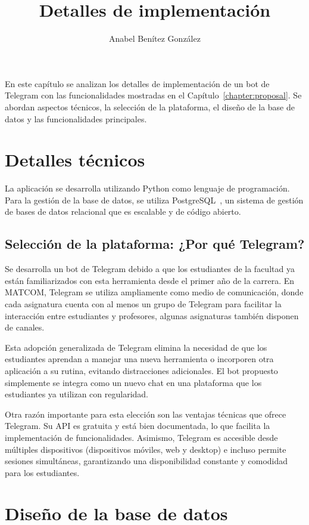 \documentclass{article}
\title{Detalles de implementación}
\author{Anabel Benítez González}
\date{}
\begin{document}
\maketitle

En este capítulo se analizan los detalles de implementación de un bot de Telegram con las funcionalidades mostradas en el Capítulo~\ref{chapter:proposal}. Se abordan aspectos técnicos, la selección de la plataforma, el diseño de la base de datos y las funcionalidades principales.

\section{Detalles técnicos}

La aplicación se desarrolla utilizando Python como lenguaje de programación. Para la gestión de la base de datos, se utiliza PostgreSQL~\cite{postgresql}, un sistema de gestión de bases de datos relacional que es escalable y de código abierto.

\subsection{Selección de la plataforma: ¿Por qué Telegram?}

Se desarrolla un bot de Telegram debido a que los estudiantes de la facultad ya están familiarizados con esta herramienta desde el primer año de la carrera. En \mbox{MATCOM}, Telegram se utiliza ampliamente como medio de comunicación, donde cada asignatura cuenta con al menos un grupo de Telegram para facilitar la interacción entre estudiantes y profesores, algunas asignaturas también disponen de canales. 

Esta adopción generalizada de Telegram elimina la necesidad de que los estudiantes aprendan a manejar una nueva herramienta o incorporen otra aplicación a su rutina, evitando distracciones adicionales. El bot propuesto simplemente se integra como un nuevo chat en una plataforma que los estudiantes ya utilizan con regularidad.

Otra razón importante para esta elección son las ventajas técnicas que ofrece Telegram. Su API es gratuita y está bien documentada, lo que facilita la implementación de funcionalidades. Asimismo, Telegram es accesible desde múltiples dispositivos (dispositivos móviles, web y desktop) e incluso permite sesiones simultáneas, garantizando una disponibilidad constante y comodidad para los estudiantes.

\section{Diseño de la base de datos}
\end{document}
